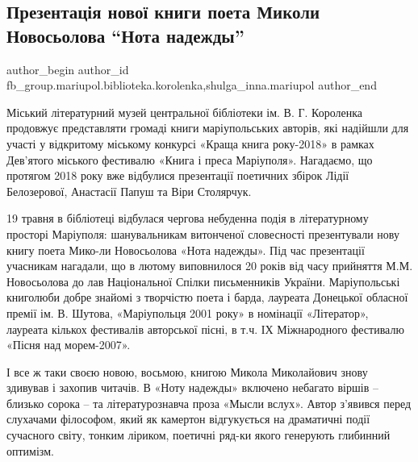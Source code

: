  
 
 
 
 

\subsection{Презентація нової книги поета Миколи Новосьолова \enquote{Нота надежды}}
\label{sec:23_05_2018.fb.fb_group.mariupol.biblioteka.korolenka.1.prezentats_ya_novo__}
 
\ifcmt
 author_begin
   author_id fb_group.mariupol.biblioteka.korolenka,shulga_inna.mariupol
 author_end
\fi

Міський літературний музей центральної бібліотеки ім. В. Г. Короленка продовжує
представляти громаді книги маріупольських авторів, які надійшли для участі у
відкритому міському конкурсі «Краща книга року-2018» в рамках Дев'ятого
міського фестивалю «Книга і преса Маріуполя». Нагадаємо, що протягом 2018 року
вже відбулися презентації поетичних збірок Лідії Белозерової, Анастасії Папуш
та Віри Столярчук.

19 травня в бібліотеці відбулася чергова небуденна подія в літературному
просторі Маріуполя: шанувальникам витонченої словесності презентували нову
книгу поета Мико-ли Новосьолова «Нота надежды». Під час презентації учасникам
нагадали, що в лютому виповнилося 20 років від часу прийняття М.М. Новосьолова
до лав Національної Спілки письменників України. Маріупольські книголюби добре
знайомі з творчістю поета і барда, лауреата Донецької обласної премії ім. В.
Шутова, «Маріупольця  2001 року» в номінації «Літератор», лауреата кількох
фестивалів авторської пісні, в т.ч. ІХ Міжнародного фестивалю «Пісня над
морем-2007».

І все ж таки своєю новою, восьмою, книгою Микола Миколайович знову здивував і
захопив читачів. В «Ноту надежды» включено небагато віршів – близько сорока –
та літературознавча проза «Мысли вслух». Автор з'явився перед слухачами
філософом, який як камертон відгукується на драматичні події сучасного світу,
тонким ліриком, поетичні ряд-ки якого генерують глибинний оптимізм.

